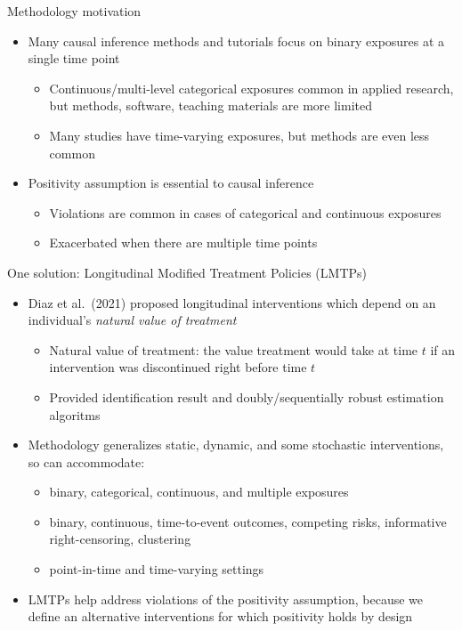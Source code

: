 \documentclass[
  10pt,
  ignorenonframetext,
]{beamer}
\providecommand{\tightlist}{%
  \setlength{\itemsep}{0pt}\setlength{\parskip}{0pt}}\usepackage{longtable,booktabs,array}
\begin{document}
\begin{frame}{Methodology motivation}
\protect\hypertarget{methodology-motivation}{}
\begin{itemize}
\item
  Many causal inference methods and tutorials focus on binary exposures
  at a single time point

  \begin{itemize}
  \item
    Continuous/multi-level categorical exposures common in applied
    research, but methods, software, teaching materials are more limited
  \item
    Many studies have time-varying exposures, but methods are even less
    common
  \end{itemize}
\item
  Positivity assumption is essential to causal inference

  \begin{itemize}
  \item
    Violations are common in cases of categorical and continuous
    exposures
  \item
    Exacerbated when there are multiple time points
  \end{itemize}
\end{itemize}
\end{frame}

\begin{frame}{One solution: Longitudinal Modified Treatment Policies
(LMTPs)}
\protect\hypertarget{one-solution-longitudinal-modified-treatment-policies-lmtps}{}
\begin{itemize}
\item
  Diaz et al.~(2021) proposed longitudinal interventions which depend on
  an individual's \emph{natural value of treatment}

  \begin{itemize}
  \item
    Natural value of treatment: the value treatment would take at time
    \(t\) if an intervention was discontinued right before time \(t\)
  \item
    Provided identification result and doubly/sequentially robust
    estimation algoritms
  \end{itemize}
\item
  Methodology generalizes static, dynamic, and some stochastic
  interventions, so can accommodate:

  \begin{itemize}
  \tightlist
  \item
    binary, categorical, continuous, and multiple exposures
  \item
    binary, continuous, time-to-event outcomes, competing risks,
    informative right-censoring, clustering
  \item
    point-in-time and time-varying settings
  \end{itemize}
\item
  LMTPs help address violations of the positivity assumption, because we
  define an alternative interventions for which positivity holds by
  design
\end{itemize}
\end{frame}
\end{document}
